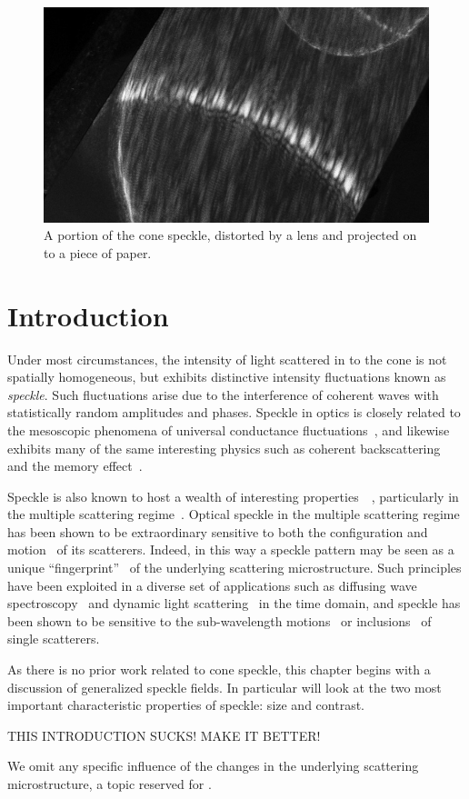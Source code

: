 \begin{figure}[ht]
\centering
\includegraphics[keepaspectratio,width=15cm]{speckle/figures/Ag_LaSFN9_cone_lens11_cam-8899.jpg}
\caption{A portion of the cone speckle, distorted by a lens and projected on to a piece of paper.}
\label{fig:examplespeckle}
\end{figure}
\section{Introduction}
Under most circumstances, the intensity of light scattered in to the cone
is not spatially homogeneous, but exhibits distinctive intensity
fluctuations known as \textit{speckle}.  Such fluctuations arise due to the
interference of coherent waves with statistically random amplitudes and
phases.  Speckle in optics is closely related to the mesoscopic phenomena
of universal conductance fluctuations~\cite{lee1985universal}, and likewise
exhibits many of the same interesting physics such as coherent
backscattering~\cite{akkermans1986coherent} and the memory
effect~\cite{freund1988memory}.

Speckle is also known to host a wealth of interesting
properties~\cite{goodman1975statistical}~\cite{freund19981001},
particularly in the multiple scattering regime~\cite{feng1986sensitivity}.
Optical speckle in the multiple scattering regime has been shown to be
extraordinary sensitive to both the configuration and
motion~\cite{berkovits1994correlations} of its scatterers.  Indeed, in this
way a speckle pattern may be seen as a unique
``fingerprint''~\cite{ravikanth2001physical} of the underlying scattering
microstructure.  Such principles have been exploited in a diverse set of
applications such as diffusing wave spectroscopy~\cite{pine1988diffusing}
and dynamic light scattering~\cite{berne2000dynamic} in the time domain,
and speckle has been shown to be sensitive to the sub-wavelength
motions~\cite{berkovits1991sensitivity} or
inclusions~\cite{berkovits1990theory} of single scatterers.

As there is no prior work related to cone speckle, this chapter begins with
a discussion of generalized speckle fields.  In
particular will look at the two most important characteristic properties of
speckle: size and contrast.  

THIS INTRODUCTION SUCKS!  MAKE IT BETTER!

We omit any
specific influence of the changes in the underlying scattering
microstructure, a topic reserved for .
